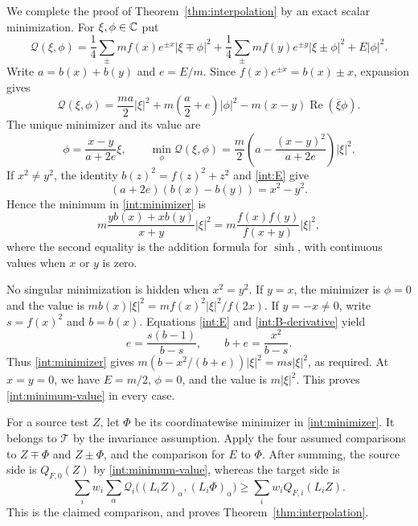 We complete the proof of Theorem~\ref{thm:interpolation} by an exact
scalar minimization.  For $\xi,\phi\in\mathbb C$ put
\begin{equation}\label{int:quadratic}
 \mathcal Q(\xi,\phi)=
 \frac14\sum_{\pm}mf(x)e^{\pm x}|\xi\mp\phi|^2
 +\frac14\sum_{\pm}mf(y)e^{\pm y}|\xi\pm\phi|^2
 +E|\phi|^2.
\end{equation}
Write $a=b(x)+b(y)$ and $e=E/m$.  Since
$f(x)e^{\pm x}=b(x)\pm x$, expansion gives
\[
 \mathcal Q(\xi,\phi)
 =\frac{ma}{2}|\xi|^2
  +m\left(\frac a2+e\right)|\phi|^2
  -m(x-y)\operatorname{Re}(\overline\xi\phi).
\]
The unique minimizer and its value are
\begin{equation}\label{int:minimizer}
 \phi=\frac{x-y}{a+2e}\xi,
 \qquad
 \min_\phi\mathcal Q(\xi,\phi)
 =\frac m2\left(a-\frac{(x-y)^2}{a+2e}\right)|\xi|^2.
\end{equation}
If $x^2\ne y^2$, the identity $b(z)^2=f(z)^2+z^2$ and
\eqref{int:E} give
\[
 (a+2e)(b(x)-b(y))=x^2-y^2.
\]
Hence the minimum in \eqref{int:minimizer} is
\begin{equation}\label{int:minimum-value}
 m\frac{y b(x)+x b(y)}{x+y}|\xi|^2
 =m\frac{f(x)f(y)}{f(x+y)}|\xi|^2,
\end{equation}
where the second equality is the addition formula for $\sinh$,
with continuous values when $x$ or $y$ is zero.

No singular minimization is hidden when $x^2=y^2$.
If $y=x$, the minimizer is $\phi=0$ and the value is
$mb(x)|\xi|^2=mf(x)^2|\xi|^2/f(2x)$.
If $y=-x\ne0$, write $s=f(x)^2$ and $b=b(x)$.
Equations \eqref{int:E} and \eqref{int:B-derivative} yield
\[
 e=\frac{s(b-1)}{b-s},\qquad
 b+e=\frac{x^2}{b-s}.
\]
Thus \eqref{int:minimizer} gives
$m(b-x^2/(b+e))|\xi|^2=ms|\xi|^2$, as required.
At $x=y=0$, we have $E=m/2$, $\phi=0$, and the value is $m|\xi|^2$.
This proves \eqref{int:minimum-value} in every case.

For a source test $Z$, let $\Phi$ be its coordinatewise minimizer in
\eqref{int:minimizer}.  It belongs to $\mathcal T$ by the invariance
assumption.  Apply the four assumed comparisons to $Z\mp\Phi$ and
$Z\pm\Phi$, and the comparison for $E$ to $\Phi$.
After summing, the source side is $Q_{F,0}(Z)$ by
\eqref{int:minimum-value}, whereas the target side is
\[
 \sum_i w_i\sum_\alpha
   \mathcal Q_i\bigl((L_iZ)_\alpha,(L_i\Phi)_\alpha\bigr)
 \ge\sum_i w_i Q_{F,i}(L_iZ).
\]
This is the claimed comparison, and proves
Theorem~\ref{thm:interpolation}.
